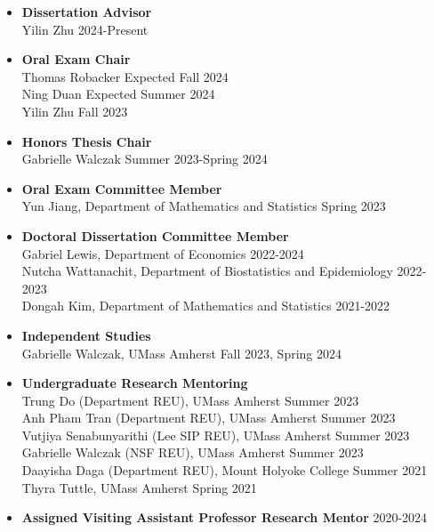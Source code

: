 \documentclass[11pt]{article}
\begin{document}
\begin{itemize} 
	\item[] \textbf{Dissertation Advisor} \\ 
	Yilin Zhu \hfill  2024-Present\vspace{-2mm}
	\item[] \textbf{Oral Exam Chair} \\ 
	Thomas Robacker \hfill Expected Fall 2024\\
	Ning Duan \hfill Expected Summer 2024\\
	Yilin Zhu \hfill Fall 2023\vspace{-2mm}
	\item[] \textbf{Honors Thesis Chair} \\ 
	Gabrielle Walczak \hfill Summer 2023-Spring 2024\vspace{-2mm}
	\item[] \textbf{Oral Exam Committee Member} \\ 
	Yun Jiang, Department of Mathematics and Statistics \hfill Spring 2023 \vspace{-2mm}
	\item[] \textbf{Doctoral Dissertation Committee Member} \\
	Gabriel Lewis, Department of Economics \hfill 2022-2024\\
	Nutcha Wattanachit, Department of Biostatistics and Epidemiology \hfill 2022-2023\\
	Dongah Kim, Department of Mathematics and Statistics \hfill 2021-2022\vspace{-2mm}
	\item[] \textbf{Independent Studies} \\ 
	Gabrielle Walczak, UMass Amherst \hfill Fall 2023, Spring 2024\vspace{-2mm}
	\item[] \textbf{Undergraduate Research Mentoring} \\ 
	Trung Do (Department REU), UMass Amherst \hfill Summer 2023\\
	Anh Pham Tran (Department REU), UMass Amherst \hfill Summer 2023\\
	Vutjiya Senabunyarithi (Lee SIP REU), UMass Amherst \hfill Summer 2023\\
	Gabrielle Walczak (NSF REU), UMass Amherst \hfill Summer 2023\\
	Daayisha Daga (Department REU), Mount Holyoke College \hfill Summer 2021\\
	Thyra Tuttle, UMass Amherst \hfill Spring 2021\vspace{-2mm}
	\item[] \textbf{Assigned Visiting Assistant Professor Research Mentor} \hfill 2020-2024 
\end{itemize}
\end{document}
